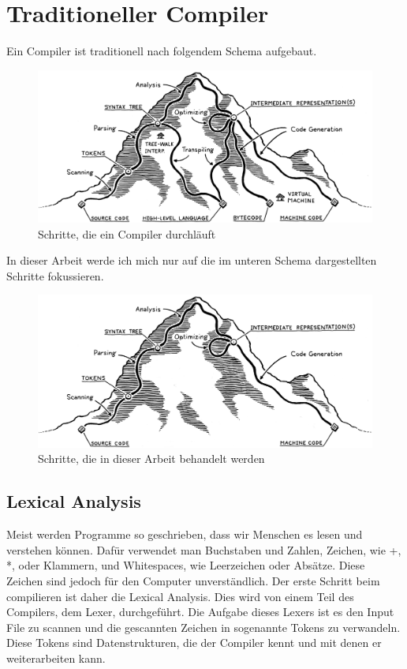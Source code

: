 \chapter{Traditioneller Compiler}

Ein Compiler ist traditionell nach folgendem Schema aufgebaut.

\begin{figure}[h!]
    \centering
    \includegraphics[scale=0.2]{resources/images/mountain.png}
    \caption[Schritte, die ein Compiler durchläuft (https://github.com/munificent/craftinginterpreters, besucht am 5.8.2024)]{Schritte, die ein Compiler durchläuft}
    \label{fig:mountain}
\end{figure}

In dieser Arbeit werde ich mich nur auf die im unteren Schema dargestellten Schritte fokussieren.

\begin{figure}[h!]
    \centering
    \includegraphics[scale=0.2]{resources/images/mountain-edited.png}
    \caption[Schritte, die in dieser Arbeit behandelt werden (Basierend auf Bild \ref{fig:mountain})]{Schritte, die in dieser Arbeit behandelt werden}
    \label{fig:mountain-edited}
\end{figure}

\section{Lexical Analysis}
Meist werden Programme so geschrieben, dass wir Menschen es lesen und verstehen können. Dafür verwendet man Buchstaben und Zahlen, Zeichen, wie +, *, oder Klammern, und Whitespaces, wie Leerzeichen oder Absätze.
Diese Zeichen sind jedoch für den Computer unverständlich. Der erste Schritt beim compilieren ist daher die Lexical Analysis. Dies wird von einem Teil des Compilers, dem Lexer, durchgeführt.
Die Aufgabe dieses Lexers ist es den Input File zu scannen und die gescannten Zeichen in sogenannte Tokens zu verwandeln. Diese Tokens sind Datenstrukturen, die der Compiler kennt und mit denen er weiterarbeiten kann.

